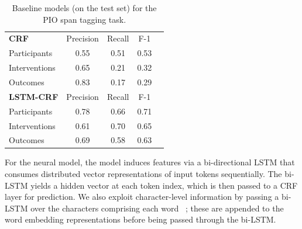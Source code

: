 \documentclass[11pt,a4paper]{article}
\begin{document}

\begin{table}%
\small
\centering
\begin{tabular}{ l c c c c}
\hline
\bf{CRF} & Precision & Recall & F-1 \\
\cline{2-4}
Participants & 0.55 & 0.51 & 0.53 \\
Interventions & 0.65 & 0.21 & 0.32 \\
Outcomes & 0.83&0.17&0.29\\
\hline
\bf{LSTM-CRF} & Precision & Recall & F-1 \\
\cline{2-4}
Participants & 0.78&0.66&0.71 \\
Interventions & 0.61&0.70&0.65 \\
Outcomes & 0.69&0.58&0.63 \\
\hline
\end{tabular}
\caption{Baseline models (on the test set) for the PIO span tagging task.}
\end{table}
For the neural model, the model induces features via a bi-directional LSTM that consumes distributed vector representations of input tokens sequentially. The bi-LSTM yields a hidden vector at each token index, which is then passed to a CRF layer for prediction. We also exploit character-level information by passing a bi-LSTM over the characters comprising each word ~\cite{lample2016neural}; these are appended to the word embedding representations before being passed through the bi-LSTM. %
\end{document}
